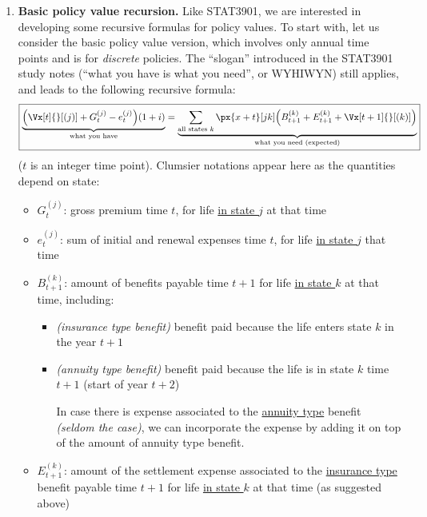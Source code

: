 \begin{enumerate}
\item \label{it:mult-state-basic-policy-val-recurs} \textbf{Basic policy value
recursion.} Like STAT3901, we are interested in developing some recursive
formulas for policy values. To start with, let us consider the basic policy
value version, which involves only annual time points and is for
\emph{discrete} policies.  The ``slogan'' introduced in the STAT3901 study
notes (``what you have is what you need'', or WYHIWYN) still applies, and leads
to the following recursive formula:
\[
\boxed{\underbrace{\qty(\Vx[t]{}[(j)]+G_t^{(j)}-e_t^{(j)})(1+i)}_{\text{what you have}}
=\underbrace{\sum_{\text{all states \(k\)}}^{}\px{x+t}[jk]
\qty(B_{t+1}^{(k)}+E_{t+1}^{(k)}+\Vx[t+1]{}[(k)])}_{\text{what you need (expected)}}}
\]
(\(t\) is an integer time point). Clumsier notations appear here as the
quantities depend on state:
\begin{itemize}
\item \(G_t^{(j)}\): gross premium  time \(t\), for life
\underline{in state \(j\)} at that time
\item \(e_t^{(j)}\): sum of initial and renewal expenses  time
\(t\), for life \underline{in state \(j\)}  that time
\item \(B_{t+1}^{(k)}\): amount of benefits payable  time \(t+1\) for
life \underline{in state \(k\)} at that time, including: \warn{}
\begin{itemize}
\item \emph{(insurance type benefit)} benefit paid because the life enters state \(k\) in the year \(t+1\)
\item \emph{(annuity type benefit)} benefit paid because the life is in state
\(k\)  time \(t+1\) (start of year \(t+2\))
\begin{note}
In case there is expense associated to the \underline{annuity type} benefit
\emph{(seldom the case)}, we can incorporate the expense by adding it on top of
the amount of annuity type benefit.
\end{note}
\end{itemize}
\item \(E_{t+1}^{(k)}\): amount of the settlement expense associated to the
\underline{insurance type} benefit payable  time \(t+1\) for life
\underline{in state \(k\)} at that time (as suggested above)
\end{itemize}


\end{enumerate}
